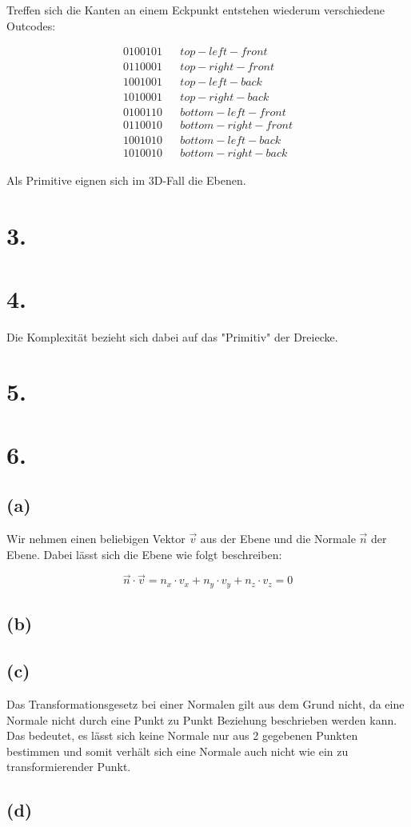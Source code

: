 \documentclass[12pt]{scrreprt}
\begin{document}
Treffen sich die Kanten an einem Eckpunkt entstehen wiederum verschiedene Outcodes:

\begin{align*}
	0100101& &top-left-front\\
	0110001& &top-right-front\\
	1001001& &top-left-back\\
	1010001& &top-right-back\\
	0100110& &bottom-left-front\\
	0110010& &bottom-right-front\\
	1001010& &bottom-left-back\\
	1010010& &bottom-right-back
\end{align*}

Als Primitive eignen sich im 3D-Fall die Ebenen.

\section*{3.}
\section*{4.}
Die Komplexität bezieht sich dabei auf das "Primitiv" der Dreiecke.
\section*{5.}
\section*{6.}
\subsection*{(a)}
Wir nehmen einen beliebigen Vektor $\vec{v}$ aus der Ebene und die Normale $\vec{n}$ der Ebene. Dabei lässt sich die Ebene wie folgt beschreiben:

\[
	\vec{n} \cdot \vec{v} = n_x \cdot v_x + n_y \cdot v_y + n_z \cdot v_z = 0
\] 
\subsection*{(b)}
\subsection*{(c)}
Das Transformationsgesetz bei einer Normalen gilt aus dem Grund nicht, da eine Normale nicht durch eine Punkt zu Punkt Beziehung beschrieben werden kann. Das bedeutet, es lässt sich keine Normale nur aus 2 gegebenen Punkten bestimmen und somit verhält sich eine Normale auch nicht wie ein zu transformierender Punkt.
\subsection*{(d)}
\end{document}
